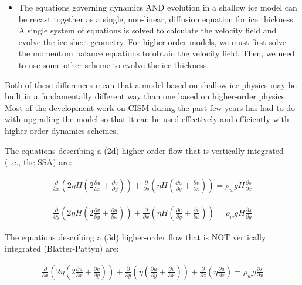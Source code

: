\begin{itemize}
\item  The equations governing dynamics AND evolution in a shallow ice model can be recast together as a single, non-linear, diffusion equation for ice thickness. A single system of equations is solved to calculate the velocity field and evolve the ice sheet geometry. For higher-order models, we must first solve the momentum balance equations to obtain the velocity field. Then, we need to use some other scheme to evolve the ice thickness. 
\end{itemize}

Both of these differences mean that a model based on shallow ice physics may be built in a fundamentally different way than one based on higher-order physics. Most of the development work on CISM during the past few years has had to do with upgrading the model so that it can be used effectively and efficiently with higher-order dynamics schemes.  

The equations describing a (2d) higher-order flow that is vertically integrated (i.e., the SSA) are:

\begin{align*}
\frac{\partial}{\partial x}\left ( 2 \eta H 
\left(2\frac{\partial u}{\partial x}+\frac{\partial v}{\partial y}\right)\right)
+\frac{\partial}{\partial y}\left(\eta H\left(
\frac{\partial u}{\partial y}+\frac{\partial v}{\partial x}\right)\right)
=\rho_w gH \frac{\partial s}{\partial x}
\end{align*}


\begin{align*}
\frac{\partial}{\partial y}\left ( 2 \eta H 
\left(2\frac{\partial v}{\partial y}+\frac{\partial u}{\partial x}\right)\right)
+\frac{\partial}{\partial x}\left(\eta H\left(
\frac{\partial u}{\partial y}+\frac{\partial v}{\partial x}\right)\right)
=\rho_w gH \frac{\partial s}{\partial y}
\end{align*}

The equations describing a (3d) higher-order flow that is NOT vertically integrated (Blatter-Pattyn) are:

\begin{align*}
\frac{\partial}{\partial x}\left ( 2 \eta  
\left(2\frac{\partial u}{\partial x}+\frac{\partial v}{\partial y}\right)\right)
+\frac{\partial}{\partial y}\left(\eta \left(
\frac{\partial u}{\partial y}+\frac{\partial v}{\partial x}\right)\right)
+\frac{\partial}{\partial z}\left(\eta \frac{\partial u}{\partial z}\right)
=\rho_w g \frac{\partial s}{\partial x}
\end{align*}


